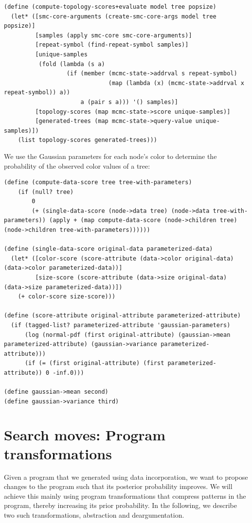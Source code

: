 \documentclass[a4paper,10pt]{article}
\begin{document}
\begin{lstlisting}[frame=trbl]
(define (compute-topology-scores+evaluate model tree popsize)
  (let* ([smc-core-arguments (create-smc-core-args model tree popsize)]
         [samples (apply smc-core smc-core-arguments)]
         [repeat-symbol (find-repeat-symbol samples)]
         [unique-samples
          (fold (lambda (s a)
                  (if (member (mcmc-state->addrval s repeat-symbol)
                              (map (lambda (x) (mcmc-state->addrval x repeat-symbol)) a))
                      a (pair s a))) '() samples)]
         [topology-scores (map mcmc-state->score unique-samples)]
         [generated-trees (map mcmc-state->query-value unique-samples)])
    (list topology-scores generated-trees)))
\end{lstlisting}
We use the Gaussian parameters for each node's color to determine the probability of the observed color values of a tree:
\begin{lstlisting}[frame=trbl]
(define (compute-data-score tree tree-with-parameters)
    (if (null? tree)
        0
        (+ (single-data-score (node->data tree) (node->data tree-with-parameters)) (apply + (map compute-data-score (node->children tree) (node->children tree-with-parameters))))))

(define (single-data-score original-data parameterized-data)
  (let* ([color-score (score-attribute (data->color original-data) (data->color parameterized-data))]
         [size-score (score-attribute (data->size original-data) (data->size parameterized-data))])
    (+ color-score size-score)))

(define (score-attribute original-attribute parameterized-attribute)
  (if (tagged-list? parameterized-attribute 'gaussian-parameters)
      (log (normal-pdf (first original-attribute) (gaussian->mean parameterized-attribute) (gaussian->variance parameterized-attribute)))
      (if (= (first original-attribute) (first parameterized-attribute)) 0 -inf.0)))

(define gaussian->mean second)
(define gaussian->variance third)
\end{lstlisting}


\newpage
\section{Search moves: Program transformations}

Given a program that we generated using data incorporation, we want to propose changes to the program such that its posterior probability improves. We will achieve this mainly using program transformations that compress patterns in the program, thereby increasing its prior probability. In the following, we describe two such transformations, abstraction and deargumentation.
\end{document}
